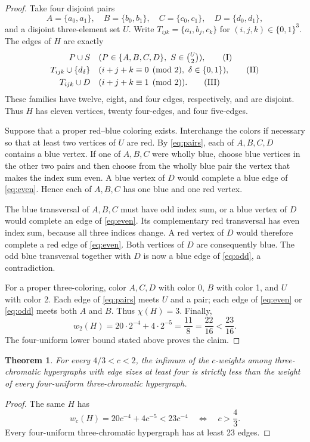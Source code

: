 \documentclass[11pt]{article}
\newtheorem{theorem}{Theorem}
\begin{document}
\begin{proof}
Take four disjoint pairs
\[
 A=\{a_0,a_1\},\quad B=\{b_0,b_1\},\quad
 C=\{c_0,c_1\},\quad D=\{d_0,d_1\},
\]
and a disjoint three-element set \(U\). Write
\(T_{ijk}=\{a_i,b_j,c_k\}\) for \((i,j,k)\in\{0,1\}^3\). The edges of
\(H\) are exactly
\begin{align}
 P\cup S
  &\quad(P\in\{A,B,C,D\},\ S\in\tbinom{U}{2}),
       \tag{I}\label{eq:pairs}\\
 T_{ijk}\cup\{d_\delta\}
  &\quad(i+j+k\equiv0\pmod2,\ \delta\in\{0,1\}),
       \tag{II}\label{eq:even}\\
 T_{ijk}\cup D
  &\quad(i+j+k\equiv1\pmod2).
       \tag{III}\label{eq:odd}
\end{align}
These families have twelve, eight, and four edges, respectively, and are
disjoint. Thus \(H\) has eleven vertices, twenty four-edges, and four
five-edges.

Suppose that a proper red--blue coloring exists. Interchange the colors if
necessary so that at least two vertices of \(U\) are red. By
\eqref{eq:pairs}, each of \(A,B,C,D\) contains a blue vertex. If one of
\(A,B,C\) were wholly blue, choose blue vertices in the other two pairs and
then choose from the wholly blue pair the vertex that makes the index sum
even. A blue vertex of \(D\) would complete a blue edge of
\eqref{eq:even}. Hence each of \(A,B,C\) has one blue and one red vertex.

The blue transversal of \(A,B,C\) must have odd index sum, or a blue vertex
of \(D\) would complete an edge of \eqref{eq:even}. Its complementary red
transversal has even index sum, because all three indices change. A red
vertex of \(D\) would therefore complete a red edge of \eqref{eq:even}.
Both vertices of \(D\) are consequently blue. The odd blue transversal
together with \(D\) is now a blue edge of \eqref{eq:odd}, a contradiction.

For a proper three-coloring, color \(A,C,D\) with color 0, \(B\) with color
1, and \(U\) with color 2. Each edge of \eqref{eq:pairs} meets \(U\) and a
pair; each edge of \eqref{eq:even} or \eqref{eq:odd} meets both \(A\) and
\(B\). Thus \(\chi(H)=3\). Finally,
\[
 w_2(H)=20\cdot2^{-4}+4\cdot2^{-5}
       =\frac{11}{8}=\frac{22}{16}<\frac{23}{16}.
\]
The four-uniform lower bound stated above proves the claim.
\end{proof}

\begin{theorem}\label{thm:c}
For every \(4/3<c<2\), the infimum of the \(c\)-weights among
three-chromatic hypergraphs with edge sizes at least four is strictly less
than the weight of every four-uniform three-chromatic hypergraph.
\end{theorem}
\begin{proof}
The same \(H\) has
\[
 w_c(H)=20c^{-4}+4c^{-5}<23c^{-4}
 \quad\Longleftrightarrow\quad c>\frac43.
\]
Every four-uniform three-chromatic hypergraph has at least 23 edges.
\end{proof}
\end{document}
